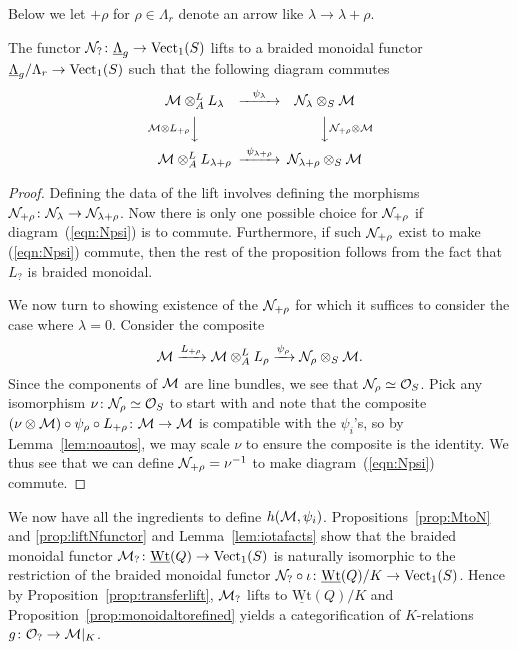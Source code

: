 \documentclass[12pt]{amsart}
\begin{document}
Below we let $+\rho$ for  $\rho \in \Lambda_r$ denote an arrow like $\lambda \to \lambda + \rho$. 
\begin{proposition}  \label{prop:liftNfunctor}
The functor $\mathcal{N}_?\colon \underline{\Lambda}_g \to \operatorname{Vect}_1(S)$ lifts to a braided monoidal functor $\underline{\Lambda}_g/\Lambda_r \to \operatorname{Vect}_1(S)$ such that the following diagram commutes
\begin{equation}  \label{eqn:Npsi}
\begin{CD}
\cM \otimes_A^L L_{\lambda} @>{\psi_{\lambda}}>> \cN_{\lambda} \otimes_S \cM \\
@V{\cM \otimes L_{+\rho}}VV @VV{\cN_{+\rho}\otimes \cM}V \\
\cM \otimes_A^L L_{\lambda+\rho} @>{\psi_{\lambda+\rho}}>> \cN_{\lambda+\rho} \otimes_S \cM
\end{CD}
\end{equation}
\end{proposition}
\begin{proof}
Defining the data of the lift involves defining the morphisms $\mathcal{N}_{+\rho}\colon \mathcal{N}_{\lambda} \to \mathcal{N}_{\lambda + \rho}$. Now there is only one possible choice for $\mathcal{N}_{+\rho}$ if diagram~(\ref{eqn:Npsi}) is to commute. Furthermore, if such $\mathcal{N}_{+\rho}$ exist to make (\ref{eqn:Npsi}) commute, then the rest of the proposition follows from the fact that $L_?$ is braided monoidal. 

We now turn to showing existence of the $\mathcal{N}_{+\rho}$ for which it suffices to consider the case where $\lambda = 0$. Consider the composite
$$ \mathcal{M} \xrightarrow{L_{+\rho}} \mathcal{M}\otimes_A^L L_{\rho} \xrightarrow{\psi_{\rho}} \mathcal{N}_{\rho} \otimes_S \mathcal{M}.$$
Since the components of $\mathcal{M}$ are line bundles, we see that $\mathcal{N}_{\rho}\simeq \mathcal{O}_S$. Pick any isomorphism $\nu\colon \mathcal{N}_{\rho} \simeq \mathcal{O}_S$ to start with and note that the composite $(\nu\otimes \mathcal{M} )\circ \psi_{\rho} \circ L_{+\rho} \colon \mathcal{M} \to \mathcal{M}$ is compatible with the $\psi_i$'s, so by Lemma~\ref{lem:noautos}, we may scale $\nu$ to ensure the composite is the identity. We thus see that we can define $\mathcal{N}_{+\rho} = \nu^{-1}$ to make diagram~(\ref{eqn:Npsi}) commute.   
\end{proof}
We now have all the ingredients to define $h(\mathcal{M},\psi_i)$. Propositions~\ref{prop:MtoN} and \ref{prop:liftNfunctor} and Lemma~\ref{lem:iotafacts} show that the braided monoidal functor $\mathcal{M}_? \colon \underline{\text{Wt}}(Q) \to \operatorname{Vect}_1(S)$ is naturally isomorphic to the restriction of the braided monoidal functor $\mathcal{N}_?\circ \iota \colon \underline{\text{Wt}}(Q)/K \to \operatorname{Vect}_1(S)$. Hence by Proposition~\ref{prop:transferlift}, $\mathcal{M}_?$ lifts to $\underline{\text{Wt}}(Q)/K$ and Proposition~\ref{prop:monoidaltorefined} yields a categorification of $K$-relations $g\colon \mathcal{O}_? \to \mathcal{M}|_K$. 
\end{document}
